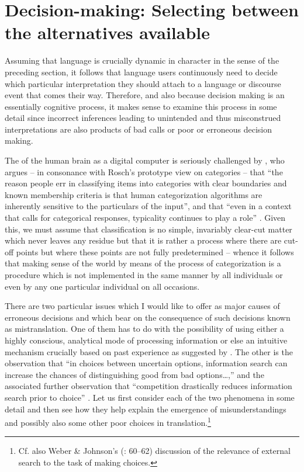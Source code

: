 \documentclass[output=paper]{LSP/langsci}
\begin{document}
\section{Decision-making: Selecting between the alternatives available}\label{hietaranta:sec:2}

Assuming that language is crucially dynamic in character in the sense of the preceding section, it follows that language users continuously need to decide which particular interpretation they should attach to a language or discourse event that comes their way. Therefore, and also because decision making is an essentially cognitive process, it makes sense to examine this process in some detail since incorrect inferences leading to unintended and thus misconstrued interpretations are also products of bad calls or poor or erroneous decision making.

  The  of the human brain as a digital computer is seriously challenged by \citet[616]{Lupyan2013}, who argues -- in consonance with Rosch's \citeyearpar{Rosch1973} prototype view on categories -- that ``the reason people err in classifying items into categories with clear boundaries and known membership criteria is that human categorization algorithms are inherently sensitive to the particulars of the input'', and that ``even in a context that calls for categorical responses, typicality continues to play a role'' \citep[631]{Lupyan2013}. Given this, we must assume that classification is no simple, invariably clear-cut matter which never leaves any residue but that it is rather a process where there are cut-off points but where these points are not fully predetermined -- whence it follows that making sense of the world by means of the process of categorization is a procedure which is not implemented in the same manner by all individuals or even by any one particular individual on all occasions.

  There are two particular issues which I would like to offer as major causes of erroneous decisions and which bear on the consequence of such decisions known as mistranslation. One of them has to do with the possibility of using either a highly conscious, analytical mode of processing information or else an intuitive mechanism crucially based on past experience as suggested by \citet{Berger2007}. The other is the observation that ``in choices between uncertain options, information search can increase the chances of distinguishing good from bad options\ldots ,'' and the associated further observation that ``competition drastically reduces information search prior to choice'' \citep[104]{Phillips2014}. Let us first consider each of the two phenomena in some detail and then see how they help explain the emergence of misunderstandings and possibly also some other poor choices in translation.\footnote{Cf. also Weber \& Johnson's (\citeyear{Weber2009}: 60--62) discussion of the relevance of external search to the task of making choices.}
\end{document}
